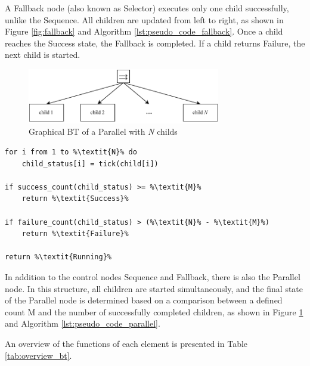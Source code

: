   A Fallback node (also known as Selector) executes only one child successfully, unlike the Sequence. All children are updated from left to right, as shown in Figure \ref{fig:fallback} and Algorithm \ref{lst:pseudo_code_fallback}. Once a child reaches the Success state, the Fallback is completed. If a child returns Failure, the next child is started.

\begin{figure}[h]
    \centering
    \includegraphics[width=0.75\textwidth]{figures/20_state_of_the_art/parallel.pdf}
    \caption{Graphical BT of a Parallel with \textit{N} childs}
    \label{fig:parallel}
\end{figure}
  
\begin{lstlisting}[float=h]
for i from 1 to %\textit{N}% do
    child_status[i] = tick(child[i])
    
if success_count(child_status) >= %\textit{M}%
    return %\textit{Success}%
        
if failure_count(child_status) > (%\textit{N}% - %\textit{M}%)
    return %\textit{Failure}%

return %\textit{Running}%
\end{lstlisting}

In addition to the control nodes Sequence and Fallback, there is also the Parallel node. In this structure, all children are started simultaneously, and the final state of the Parallel node is determined based on a comparison between a defined count M and the number of successfully completed children, as shown in Figure \ref{fig:parallel} and Algorithm \ref{lst:pseudo_code_parallel}.

An overview of the functions of each element is presented in Table \ref{tab:overview_bt}.

